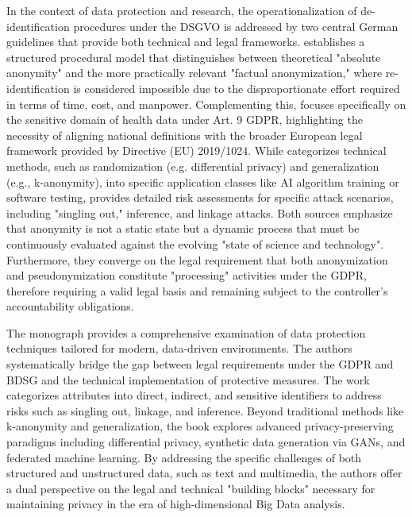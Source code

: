 In the context of data protection and research, the operationalization of de-identification procedures under the \ac{DSGVO} is addressed by two central German guidelines that provide both technical and legal frameworks. \textcite{schwartmann2022praxisleitfaden} establishes a structured procedural model that distinguishes between theoretical "absolute anonymity" and the more practically relevant "factual anonymization," where re-identification is considered impossible due to the disproportionate effort required in terms of time, cost, and manpower. Complementing this, \textcite{gmdsbvd2024praxishilfe} focuses specifically on the sensitive domain of health data under Art. 9 \ac{GDPR}, highlighting the necessity of aligning national definitions with the broader European legal framework provided by Directive (EU) 2019/1024. While \textcite{schwartmann2022praxisleitfaden} categorizes technical methods, such as randomization (e.g. differential privacy) and generalization (e.g., k-anonymity), into specific application classes like AI algorithm training or software testing, \textcite{gmdsbvd2024praxishilfe} provides detailed risk assessments for specific attack scenarios, including "singling out," inference, and linkage attacks. Both sources emphasize that anonymity is not a static state but a dynamic process that must be continuously evaluated against the evolving "state of science and technology". Furthermore, they converge on the legal requirement that both anonymization and pseudonymization constitute "processing" activities under the  \ac{GDPR}, therefore requiring a valid legal basis and remaining subject to the controller's accountability obligations.

The monograph \textcite{Krebs2022} provides a comprehensive examination of data protection techniques tailored for modern, data-driven environments. The authors systematically bridge the gap between legal requirements under the \ac{GDPR} and \ac{BDSG} and the technical implementation of protective measures. The work categorizes attributes into direct, indirect, and sensitive identifiers to address risks such as singling out, linkage, and inference. Beyond traditional methods like k-anonymity and generalization, the book explores advanced privacy-preserving paradigms including differential privacy, synthetic data generation via \acp{GAN}, and federated machine learning. By addressing the specific challenges of both structured and unstructured data, such as text and multimedia, the authors offer a dual perspective on the legal and technical "building blocks" necessary for maintaining privacy in the era of high-dimensional Big Data analysis.

